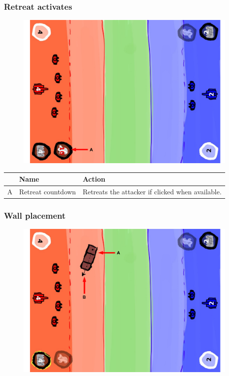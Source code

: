 \documentclass[12pt,a4paper]{article}
\begin{document}
\subsubsection{Retreat activates}\label{mock:765}
\begin{figure}[H]
  \centering
  \includegraphics[width=11cm]{pic/mocks/6-5.pdf}
\end{figure}

\begin{table}[H]
\small
\centering
\begin{tabular}{c|p{5cm}|p{7cm}}
& Name & Action \\ \hline\hline
A
&Retreat countdown
&Retreats the attacker if clicked when available.
\end{tabular}
\end{table}

\newpage
\subsubsection{Wall placement}\label{mock:766}
\begin{figure}[H]
  \centering
  \includegraphics[width=11cm]{pic/mocks/6-6.pdf}
\end{figure}
\end{document}

